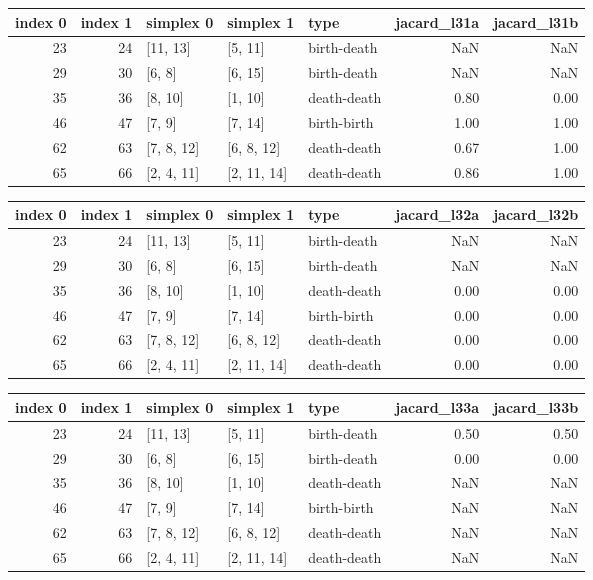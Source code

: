 \documentclass{article}
\begin{document}
\begin{center}
\begin{tabular}{rrlllrr}
\toprule
index 0 & index 1 & simplex 0 & simplex 1 & type & jacard\_l31a & jacard\_l31b \\
\midrule
23 & 24 & [11, 13] & [5, 11] & birth-death & NaN & NaN \\
29 & 30 & [6, 8] & [6, 15] & birth-death & NaN & NaN \\
35 & 36 & [8, 10] & [1, 10] & death-death & 0.80 & 0.00 \\
46 & 47 & [7, 9] & [7, 14] & birth-birth & 1.00 & 1.00 \\
62 & 63 & [7, 8, 12] & [6, 8, 12] & death-death & 0.67 & 1.00 \\
65 & 66 & [2, 4, 11] & [2, 11, 14] & death-death & 0.86 & 1.00 \\
\bottomrule
\end{tabular}
\end{center}

\begin{center}
\begin{tabular}{rrlllrr}
\toprule
index 0 & index 1 & simplex 0 & simplex 1 & type & jacard\_l32a & jacard\_l32b \\
\midrule
23 & 24 & [11, 13] & [5, 11] & birth-death & NaN & NaN \\
29 & 30 & [6, 8] & [6, 15] & birth-death & NaN & NaN \\
35 & 36 & [8, 10] & [1, 10] & death-death & 0.00 & 0.00 \\
46 & 47 & [7, 9] & [7, 14] & birth-birth & 0.00 & 0.00 \\
62 & 63 & [7, 8, 12] & [6, 8, 12] & death-death & 0.00 & 0.00 \\
65 & 66 & [2, 4, 11] & [2, 11, 14] & death-death & 0.00 & 0.00 \\
\bottomrule
\end{tabular}
\end{center}

\begin{center}
\begin{tabular}{rrlllrr}
\toprule
index 0 & index 1 & simplex 0 & simplex 1 & type & jacard\_l33a & jacard\_l33b \\
\midrule
23 & 24 & [11, 13] & [5, 11] & birth-death & 0.50 & 0.50 \\
29 & 30 & [6, 8] & [6, 15] & birth-death & 0.00 & 0.00 \\
35 & 36 & [8, 10] & [1, 10] & death-death & NaN & NaN \\
46 & 47 & [7, 9] & [7, 14] & birth-birth & NaN & NaN \\
62 & 63 & [7, 8, 12] & [6, 8, 12] & death-death & NaN & NaN \\
65 & 66 & [2, 4, 11] & [2, 11, 14] & death-death & NaN & NaN \\
\bottomrule
\end{tabular}
\end{center}
\end{document}
